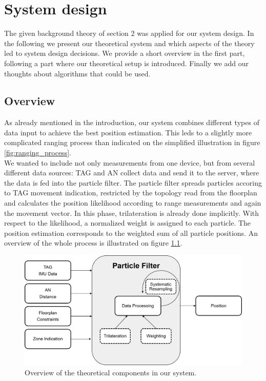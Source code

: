 
\chapter{System design} %

\label{Chapter3} %
The given background theory of section 2 was applied for our system design. In the following we present our theoretical system and which aspects of the theory led to system design decisions. We provide a short overview in the first part, following a part where our theoretical setup is introduced. Finally we add our thoughts about algorithms that could be used.


\section{Overview}
As already mentioned in the introduction, our system combines different types of data input to achieve the best position estimation. This leds to a slightly more complicated ranging process than indicated on the simplified illustration in figure \ref{fig:ranging_process}.\\
We wanted to include not only measurements from one device, but from several different data sources:
TAG and AN collect data and send it to the server, where the data is fed into the particle filter. The particle filter spreads particles accoring to TAG movement indication, restricted by the topology read from the floorplan and calculates the position likelihood according to range measurements and again the movement vector. In this phase, trilateration is already done implicitly. With respect to the likelihood, a normalized weight is assigned to each particle. The position estimation corresponds to the weighted sum of all particle positions.
An overview of the whole process is illustrated on figure \ref{fig:particle_filter_design}.

\begin{figure}[th]
\centering
\includegraphics[width=1.0\textwidth]{Figures/particle_filter_design}
\decoRule
\caption[Particle Filter Design]{Overview of the theoretical components in our system.}
\label{fig:particle_filter_design}
\end{figure}


